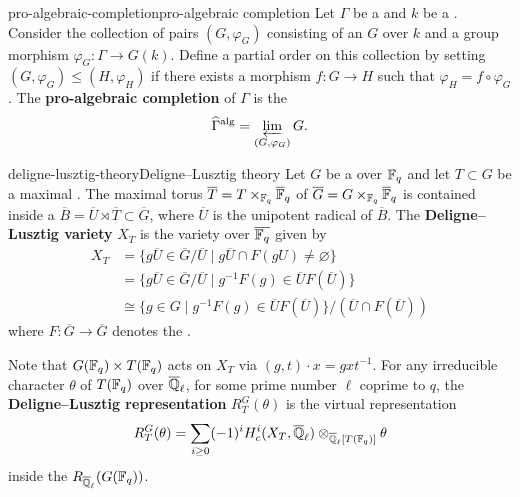 \begin{topic}{pro-algebraic-completion}{pro-algebraic completion}
    Let $\Gamma$ be a  and $k$ be a . Consider the collection of pairs $(G, \varphi_G)$ consisting of an   $G$ over $k$ and a group morphism $\varphi_G : \Gamma \to G(k)$. Define a partial order on this collection by setting $(G, \varphi_G) \le (H, \varphi_H)$ if there exists a morphism $f : G \to H$ such that $\varphi_H = f \circ \varphi_G$. The \textbf{pro-algebraic completion} of $\Gamma$ is the 
    \[ \widehat{\Gamma}^\textup{alg} = \varprojlim_{(G, \varphi_G)} G . \]
\end{topic}

\begin{topic}{deligne-lusztig-theory}{Deligne--Lusztig theory}
    Let $G$ be a    over $\mathbb{F}_q$ and let $T \subset G$ be a maximal . The maximal torus $\overline{T} = T \times_{\mathbb{F}_q} \overline{\mathbb{F}}_q$ of $\overline{G} = G \times_{\mathbb{F}_q} \overline{\mathbb{F}}_q$ is contained inside a  $\overline{B} = \overline{U} \rtimes \overline{T} \subset \overline{G}$, where $\overline{U}$ is the unipotent radical of $\overline{B}$.
    The \textbf{Deligne--Lusztig variety} $X_T$ is the variety over $\overline{\mathbb{F}_q}$ given by
    \[ \begin{aligned}
        X_T &= \{ g \overline{U} \in \overline{G} / \overline{U} \mid g \overline{U} \cap F(g U) \ne \varnothing \} \\
            &= \{ g \overline{U} \in \overline{G} / \overline{U} \mid g^{-1} F(g) \in \overline{U} F(\overline{U}) \} \\
            &\cong \{ g \in G \mid g^{-1} F(g) \in \overline{U} F(\overline{U}) \} / (\overline{U} \cap F(\overline{U}))
    \end{aligned} \]
    where $F : \overline{G} \to \overline{G}$ denotes the .
    
    Note that $G(\mathbb{F}_q) \times T(\mathbb{F}_q)$ acts on $X_T$ via $(g, t) \cdot x = g x t^{-1}$. For any irreducible character $\theta$ of $T(\mathbb{F}_q)$ over $\overline{\mathbb{Q}}_\ell$, for some prime number $\ell$ coprime to $q$, the \textbf{Deligne--Lusztig representation} $R^G_T(\theta)$ is the virtual representation
    \[ R^G_T(\theta) = \sum_{i \ge 0} (-1)^i H_c^i(X_T, \overline{\mathbb{Q}}_\ell) \otimes_{\overline{\mathbb{Q}}_\ell[T(\mathbb{F}_q)]} \theta \]
    inside the  $R_{\overline{\mathbb{Q}}_\ell}(G(\mathbb{F}_q))$.
\end{topic}

